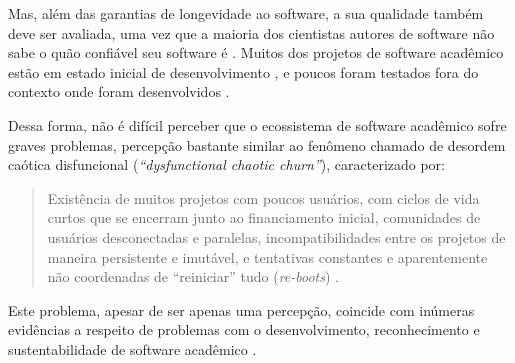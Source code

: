 Mas, além das garantias de longevidade ao software, a sua qualidade também deve
ser avaliada, uma vez que
a maioria dos cientistas autores
de software não sabe o quão confiável seu software é
\cite{merali2010computational}.
Muitos dos projetos de software acadêmico estão
em estado inicial de desenvolvimento \cite{marshall2013tools}, e poucos foram
testados fora do contexto onde foram desenvolvidos \cite{portillo2012tools}.

Dessa forma, não é difícil perceber que o ecossistema de software acadêmico sofre graves
problemas, percepção bastante similar ao fenômeno chamado de  desordem
caótica disfuncional ({\it ``dysfunctional chaotic churn''}), caracterizado
por:

\begin{quote}
Existência de muitos projetos com poucos usuários,
com ciclos de vida curtos que se encerram junto ao financiamento inicial,
comunidades de usuários desconectadas e paralelas,
incompatibilidades entre os projetos de maneira persistente e imutável, e
tentativas constantes e aparentemente não coordenadas de ``reiniciar'' tudo ({\it re-boots})
\cite{howison2015understanding}.
\end{quote}

Este problema, apesar de ser apenas uma percepção, coincide com inúmeras
evidências a respeito de problemas com o desenvolvimento, reconhecimento e
sustentabilidade de software acadêmico \cite{allen2017engineering}.

